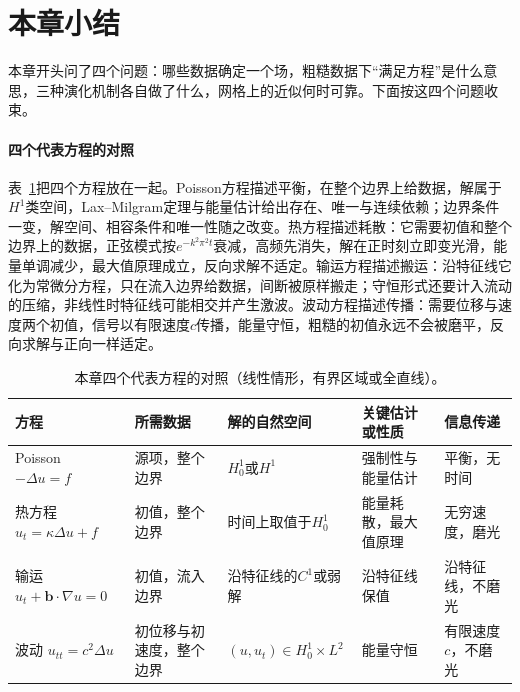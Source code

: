 
\section{本章小结}
\label{sec:pde-summary}

本章开头问了四个问题：哪些数据确定一个场，粗糙数据下“满足方程”是什么意思，三种演化机制各自做了什么，网格上的近似何时可靠。下面按这四个问题收束。

\paragraph{四个代表方程的对照}
表~\ref{tab:pde-four-equations}把四个方程放在一起。Poisson方程描述平衡，在整个边界上给数据，解属于$H^1$类空间，Lax--Milgram定理与能量估计给出存在、唯一与连续依赖；边界条件一变，解空间、相容条件和唯一性随之改变。热方程描述耗散：它需要初值和整个边界上的数据，正弦模式按$e^{-k^2\pi^2t}$衰减，高频先消失，解在正时刻立即变光滑，能量单调减少，最大值原理成立，反向求解不适定。输运方程描述搬运：沿特征线它化为常微分方程，只在流入边界给数据，间断被原样搬走；守恒形式还要计入流动的压缩，非线性时特征线可能相交并产生激波。波动方程描述传播：需要位移与速度两个初值，信号以有限速度$c$传播，能量守恒，粗糙的初值永远不会被磨平，反向求解与正向一样适定。

\begin{table}[!htb]
  \centering
  \begin{tabularx}{\linewidth}{@{}l>{\RaggedRight\arraybackslash}X>{\RaggedRight\arraybackslash}X>{\RaggedRight\arraybackslash}X>{\RaggedRight\arraybackslash}X@{}}
    \toprule
    方程 & 所需数据 & 解的自然空间 & 关键估计或性质 & 信息传递 \\
    \midrule
    Poisson $-\Delta u=f$ & 源项，整个边界 & $H_0^1$或$H^1$ & 强制性与能量估计 & 平衡，无时间 \\
    热方程 $u_t=\kappa\Delta u+f$ & 初值，整个边界 & 时间上取值于$H_0^1$ & 能量耗散，最大值原理 & 无穷速度，磨光 \\
    输运 $u_t+\bm b\cdot\nabla u=0$ & 初值，流入边界 & 沿特征线的$C^1$或弱解 & 沿特征线保值 & 沿特征线，不磨光 \\
    波动 $u_{tt}=c^2\Delta u$ & 初位移与初速度，整个边界 & $(u,u_t)\in H_0^1\times L^2$ & 能量守恒 & 有限速度$c$，不磨光 \\
    \bottomrule
  \end{tabularx}
  \caption{本章四个代表方程的对照（线性情形，有界区域或全直线）。}
  \label{tab:pde-four-equations}
\end{table}

